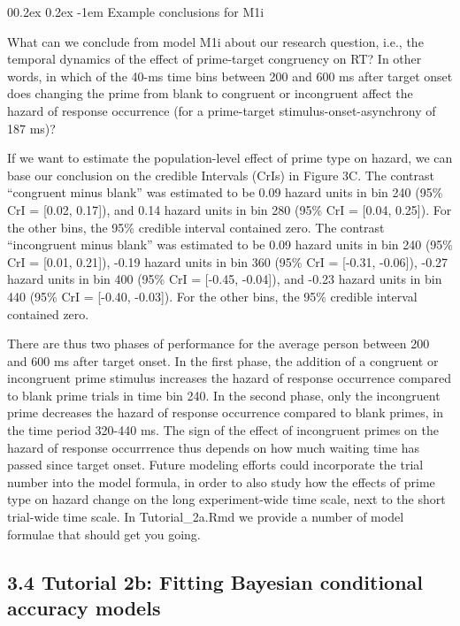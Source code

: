 \documentclass[
  man, donotrepeattitle,floatsintext]{apa6}
\makeatletter
\let\oldparagraph\paragraph
\renewcommand{\paragraph}{
    \@ifstar
      \xxxParagraphStar
      \xxxParagraphNoStar
  }
\newcommand{\xxxParagraphStar}[1]{\oldparagraph*{#1}\mbox{}}
\newcommand{\xxxParagraphNoStar}[1]{\oldparagraph{#1}\mbox{}}
\renewcommand{\paragraph}{\@startsection{paragraph}{4}{\parindent}%
  {0\baselineskip \@plus 0.2ex \@minus 0.2ex}%
  {-1em}%
  {\normalfont\normalsize\bfseries\itshape\typesectitle}}
\makeatother
\begin{document}
\paragraph{Example conclusions for M1i}\label{example-conclusions-for-m1i}

What can we conclude from model M1i about our research question, i.e., the temporal dynamics of the effect of prime-target congruency on RT? In other words, in which of the 40-ms time bins between 200 and 600 ms after target onset does changing the prime from blank to congruent or incongruent affect the hazard of response occurrence (for a prime-target stimulus-onset-asynchrony of 187 ms)?

If we want to estimate the population-level effect of prime type on hazard, we can base our conclusion on the credible Intervals (CrIs) in Figure 3C. The contrast ``congruent minus blank'' was estimated to be 0.09 hazard units in bin 240 (95\% CrI = {[}0.02, 0.17{]}), and 0.14 hazard units in bin 280 (95\% CrI = {[}0.04, 0.25{]}). For the other bins, the 95\% credible interval contained zero.
The contrast ``incongruent minus blank'' was estimated to be 0.09 hazard units in bin 240 (95\% CrI = {[}0.01, 0.21{]}), -0.19 hazard units in bin 360 (95\% CrI = {[}-0.31, -0.06{]}), -0.27 hazard units in bin 400 (95\% CrI = {[}-0.45, -0.04{]}), and -0.23 hazard units in bin 440 (95\% CrI = {[}-0.40, -0.03{]}). For the other bins, the 95\% credible interval contained zero.

There are thus two phases of performance for the average person between 200 and 600 ms after target onset. In the first phase, the addition of a congruent or incongruent prime stimulus increases the hazard of response occurrence compared to blank prime trials in time bin 240. In the second phase, only the incongruent prime decreases the hazard of response occurrence compared to blank primes, in the time period 320-440 ms. The sign of the effect of incongruent primes on the hazard of response occurrrence thus depends on how much waiting time has passed since target onset. Future modeling efforts could incorporate the trial number into the model formula, in order to also study how the effects of prime type on hazard change on the long experiment-wide time scale, next to the short trial-wide time scale. In Tutorial\_2a.Rmd we provide a number of model formulae that should get you going.

\subsection{3.4 Tutorial 2b: Fitting Bayesian conditional accuracy models}\label{tutorial-2b-fitting-bayesian-conditional-accuracy-models}
\end{document}
